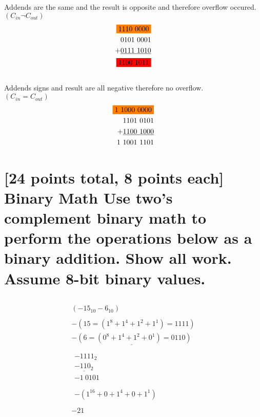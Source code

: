 \documentclass[12pt]{article}
\begin{document}
\subsection{}
Addends are the same and the result is opposite and therefore overflow occured. \\
$(C_{in} \neg C_{out})$
\begin{equation}
	\begin{split}
		\colorbox{orange}{1110\ 0000} \\
		0101\ 0001 \\ + \underline{0111\ 1010}\\
		\colorbox{red}{1100\ 1011}
	\end{split}
\end{equation}

\subsection{}
Addends signs and result are all negative therefore no overflow.\\
$(C_{in} = C_{out})$
\begin{equation}
	\begin{split}
		\colorbox{orange}{1\ 1000\ 0000}\\
		1101\ 0101 \\ + \underline{1100\ 1000}\\
		1\ 1001\ 1101 
	\end{split}
\end{equation}

\section{
	[24 points total, 8 points each] Binary Math
Use two's complement binary math to perform the operations below as a binary addition.
Show all work. Assume 8-bit binary values.
}
\subsection{}
\begin{gather*}
(-15_{10} -6_{10}) \\ \\
-(15 = (1^8 + 1^4 + 1^2 + 1^1) = 1111) \\
\underline{-(6 = (0^8 + 1^4 + 1^2 + 0^1) = 0110)}\\ \\
\begin{split}
-1111_2\\ \underline{-110_2}\\
-1\ 0101
\end{split} \\ \\
\begin{split}
-(1^{16} + 0 + 1^{4} + 0 + 1^{1})
\end{split} \\ \\
-21
\end{gather*}
\end{document}
